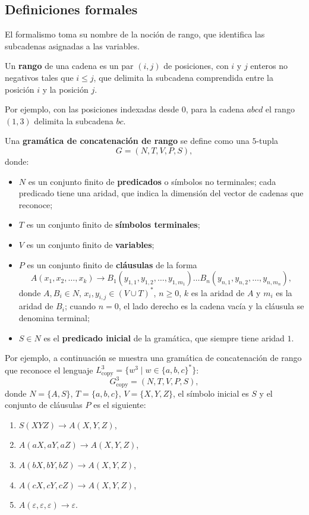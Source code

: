 \subsection{Definiciones formales}

El formalismo toma su nombre de la noción de rango, que identifica las
subcadenas asignadas a las variables.

\begin{definicion}
Un \textbf{rango} de una cadena es un par $(i, j)$ de posiciones, con
$i$ y $j$ enteros no negativos tales que $i \le j$, que delimita la
subcadena comprendida entre la posición $i$ y la posición $j$.
\end{definicion}

Por ejemplo, con las posiciones indexadas desde $0$, para la cadena
$abcd$ el rango $(1, 3)$ delimita la subcadena $bc$.

\begin{definicion}
\label{def:rcg}
Una \textbf{gramática de concatenación de rango} se define como una
$5$-tupla
\[
  G = (N, T, V, P, S),
\]
donde:
\begin{itemize}
  \item $N$ es un conjunto finito de \textbf{predicados} o símbolos no
    terminales; cada predicado tiene una aridad, que indica la dimensión
    del vector de cadenas que reconoce;
  \item $T$ es un conjunto finito de \textbf{símbolos terminales};
  \item $V$ es un conjunto finito de \textbf{variables};
  \item $P$ es un conjunto finito de \textbf{cláusulas} de la forma
    \[
      A(x_1, x_2, \dots, x_k) \to B_1(y_{1,1}, y_{1,2}, \dots, y_{1,m_1})
      \dots B_n(y_{n,1}, y_{n,2}, \dots, y_{n,m_n}),
    \]
    donde $A, B_i \in N$, $x_i, y_{i,j} \in (V \cup T)^*$, $n \ge 0$,
    $k$ es la aridad de $A$ y $m_i$ es la aridad de $B_i$; cuando
    $n = 0$, el lado derecho es la cadena vacía y la cláusula se
    denomina terminal;
  \item $S \in N$ es el \textbf{predicado inicial} de la gramática, que
    siempre tiene aridad $1$.
\end{itemize}
\end{definicion}

Por ejemplo, a continuación se muestra una gramática de concatenación
de rango que reconoce el lenguaje $L_{\mathrm{copy}}^3 = \{ w^3 \mid w
\in \{a, b, c\}^* \}$:
\[
  G_{\mathrm{copy}}^3 = (N, T, V, P, S),
\]
donde $N = \{A, S\}$, $T = \{a, b, c\}$, $V = \{X, Y, Z\}$, el símbolo
inicial es $S$ y el conjunto de cláusulas $P$ es el siguiente:
\begin{enumerate}
  \item $S(XYZ) \to A(X, Y, Z)$,
  \item $A(aX, aY, aZ) \to A(X, Y, Z)$,
  \item $A(bX, bY, bZ) \to A(X, Y, Z)$,
  \item $A(cX, cY, cZ) \to A(X, Y, Z)$,
  \item $A(\varepsilon, \varepsilon, \varepsilon) \to \varepsilon$.
\end{enumerate}

